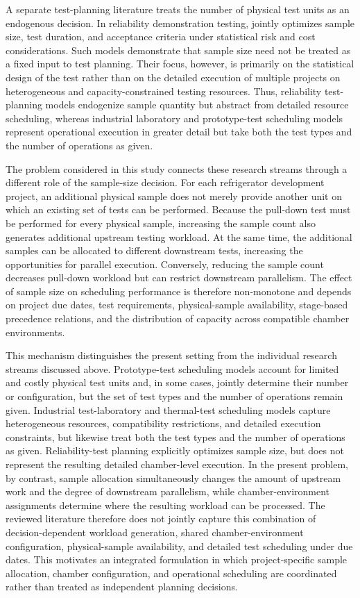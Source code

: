 A separate test-planning literature treats the number of physical test units
as an endogenous decision.
In reliability demonstration testing, \citet{Fernandez2022} jointly
optimizes sample size, test duration, and acceptance criteria under
statistical risk and cost considerations.
Such models demonstrate that sample size need not be treated as a fixed
input to test planning.
Their focus, however, is primarily on the statistical design of the test
rather than on the detailed execution of multiple projects on heterogeneous
and capacity-constrained testing resources.
Thus, reliability test-planning models endogenize sample quantity but
abstract from detailed resource scheduling, whereas industrial laboratory
and prototype-test scheduling models represent operational execution in
greater detail but take both the test types and the number of operations
as given.

The problem considered in this study connects these research streams through
a different role of the sample-size decision.
For each refrigerator development project, an additional physical sample
does not merely provide another unit on which an existing set of tests can
be performed.
Because the pull-down test must be performed for every physical sample,
increasing the sample count also generates additional upstream testing
workload.
At the same time, the additional samples can be allocated to different
downstream tests, increasing the opportunities for parallel execution.
Conversely, reducing the sample count decreases pull-down workload but can
restrict downstream parallelism.
The effect of sample size on scheduling performance is therefore
non-monotone and depends on project due dates, test requirements,
physical-sample availability, stage-based precedence relations, and the
distribution of capacity across compatible chamber environments.

This mechanism distinguishes the present setting from the individual
research streams discussed above.
Prototype-test scheduling models account for limited and costly physical
test units and, in some cases, jointly determine their number or
configuration, but the set of test types and the number of operations
remain given.
Industrial test-laboratory and thermal-test scheduling models capture
heterogeneous resources, compatibility restrictions, and detailed execution
constraints, but likewise treat both the test types and the number of
operations as given.
Reliability-test planning explicitly optimizes sample size, but does not
represent the resulting detailed chamber-level execution.
In the present problem, by contrast, sample allocation simultaneously
changes the amount of upstream work and the degree of downstream
parallelism, while chamber-environment assignments determine where the
resulting workload can be processed.
The reviewed literature therefore does not jointly capture this combination
of decision-dependent workload generation, shared chamber-environment
configuration, physical-sample availability, and detailed test scheduling
under due dates.
This motivates an integrated formulation in which project-specific sample
allocation, chamber configuration, and operational scheduling are
coordinated rather than treated as independent planning decisions.
